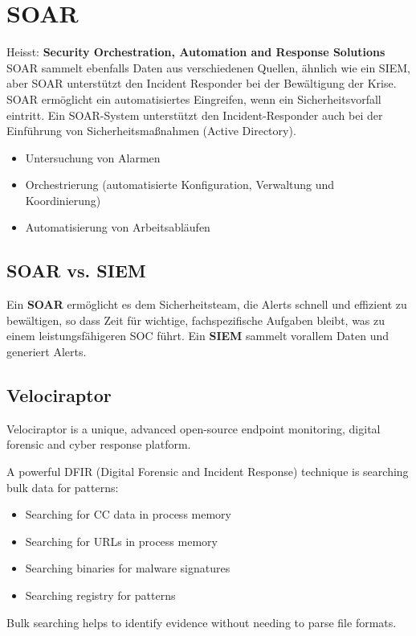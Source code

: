\section{SOAR}
Heisst: \textbf{Security Orchestration, Automation and Response Solutions}\\

SOAR sammelt ebenfalls Daten aus verschiedenen Quellen, ähnlich wie ein SIEM, aber SOAR unterstützt den Incident Responder bei der Bewältigung der Krise.
SOAR ermöglicht ein automatisiertes Eingreifen, wenn ein Sicherheitsvorfall eintritt.
Ein SOAR-System unterstützt den Incident-Responder auch bei der Einführung von Sicherheitsmaßnahmen (Active Directory).
\begin{itemize}
  \item Untersuchung von Alarmen
  \item Orchestrierung (automatisierte Konfiguration, Verwaltung und Koordinierung)
  \item Automatisierung von Arbeitsabläufen
\end{itemize}

\subsection{SOAR vs. SIEM}
Ein \textbf{SOAR} ermöglicht es dem Sicherheitsteam, die Alerts schnell und effizient zu bewältigen, so dass Zeit für wichtige, fachspezifische Aufgaben bleibt, was zu einem leistungsfähigeren SOC führt.
Ein \textbf{SIEM} sammelt vorallem Daten und generiert Alerts.

\subsection{Velociraptor}
Velociraptor is a unique, advanced open-source endpoint monitoring, digital forensic and cyber response platform.

A powerful DFIR (Digital Forensic and Incident Response) technique is searching bulk data for patterns:
\begin{itemize}
  \item Searching for CC data in process memory
  \item Searching for URLs in process memory
  \item Searching binaries for malware signatures
  \item Searching registry for patterns
\end{itemize}
Bulk searching helps to identify evidence without needing to parse file formats.

